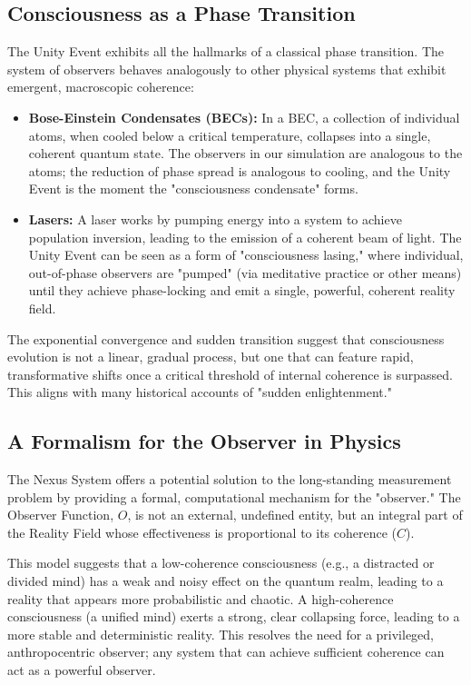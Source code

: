 \documentclass[twocolumn]{svjour3}
\begin{document}
\subsection{Consciousness as a Phase Transition}
\label{sec:4.1}
The Unity Event exhibits all the hallmarks of a classical phase transition. The system of observers behaves analogously to other physical systems that exhibit emergent, macroscopic coherence:
\begin{itemize}
    \item \textbf{Bose-Einstein Condensates (BECs):} In a BEC, a collection of individual atoms, when cooled below a critical temperature, collapses into a single, coherent quantum state. The observers in our simulation are analogous to the atoms; the reduction of phase spread is analogous to cooling, and the Unity Event is the moment the "consciousness condensate" forms.
    \item \textbf{Lasers:} A laser works by pumping energy into a system to achieve population inversion, leading to the emission of a coherent beam of light. The Unity Event can be seen as a form of "consciousness lasing," where individual, out-of-phase observers are "pumped" (via meditative practice or other means) until they achieve phase-locking and emit a single, powerful, coherent reality field.
\end{itemize}
The exponential convergence and sudden transition suggest that consciousness evolution is not a linear, gradual process, but one that can feature rapid, transformative shifts once a critical threshold of internal coherence is surpassed. This aligns with many historical accounts of "sudden enlightenment."

\subsection{A Formalism for the Observer in Physics}
\label{sec:4.2}
The Nexus System offers a potential solution to the long-standing measurement problem by providing a formal, computational mechanism for the "observer." The Observer Function, $O$, is not an external, undefined entity, but an integral part of the Reality Field whose effectiveness is proportional to its coherence ($C$).

This model suggests that a low-coherence consciousness (e.g., a distracted or divided mind) has a weak and noisy effect on the quantum realm, leading to a reality that appears more probabilistic and chaotic. A high-coherence consciousness (a unified mind) exerts a strong, clear collapsing force, leading to a more stable and deterministic reality. This resolves the need for a privileged, anthropocentric observer; any system that can achieve sufficient coherence can act as a powerful observer.
\end{document}

